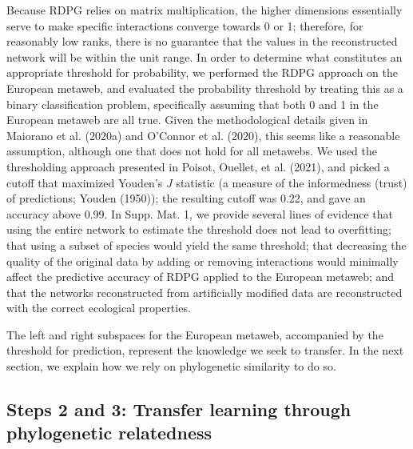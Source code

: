 \documentclass[11pt]{article}
\begin{document}
Because RDPG relies on matrix multiplication, the higher dimensions
essentially serve to make specific interactions converge towards 0 or 1;
therefore, for reasonably low ranks, there is no guarantee that the
values in the reconstructed network will be within the unit range. In
order to determine what constitutes an appropriate threshold for
probability, we performed the RDPG approach on the European metaweb, and
evaluated the probability threshold by treating this as a binary
classification problem, specifically assuming that both 0 and 1 in the
European metaweb are all true. Given the methodological details given in
Maiorano et al. (2020a) and O'Connor et al. (2020), this seems like a
reasonable assumption, although one that does not hold for all metawebs.
We used the thresholding approach presented in Poisot, Ouellet, et al.
(2021), and picked a cutoff that maximized Youden's \(J\) statistic (a
measure of the informedness (trust) of predictions; Youden (1950)); the
resulting cutoff was 0.22, and gave an accuracy above 0.99. In Supp.
Mat. 1, we provide several lines of evidence that using the entire
network to estimate the threshold does not lead to overfitting; that
using a subset of species would yield the same threshold; that
decreasing the quality of the original data by adding or removing
interactions would minimally affect the predictive accuracy of RDPG
applied to the European metaweb; and that the networks reconstructed
from artificially modified data are reconstructed with the correct
ecological properties.

The left and right subspaces for the European metaweb, accompanied by
the threshold for prediction, represent the knowledge we seek to
transfer. In the next section, we explain how we rely on phylogenetic
similarity to do so.

\hypertarget{steps-2-and-3-transfer-learning-through-phylogenetic-relatedness}{%
\subsection{Steps 2 and 3: Transfer learning through phylogenetic
relatedness}\label{steps-2-and-3-transfer-learning-through-phylogenetic-relatedness}}
\end{document}
